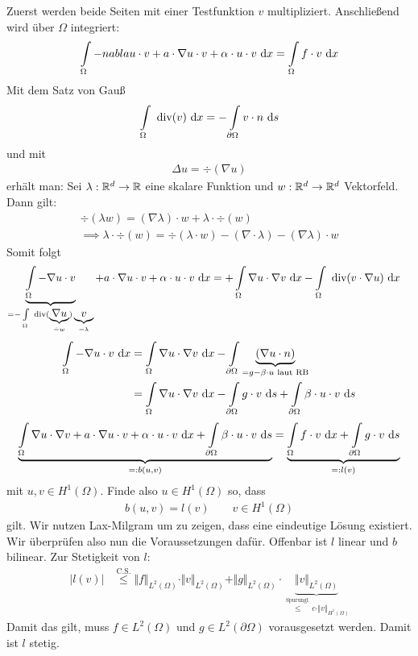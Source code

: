 \documentclass[12pt,a4paper]{article}
\begin{document}
\begin{lösung}
Zuerst werden beide Seiten mit einer Testfunktion $v$ multipliziert. Anschließend wird über $\Omega$ integriert:
\begin{align*}
\int\limits_\Omega -nabla u\cdot v+a\cdot\nabla u\cdot v+\alpha\cdot u\cdot v\text{ d} x=\int\limits_\Omega f\cdot v\text{ d} x
\end{align*}
 Mit dem Satz von Gauß 
 \begin{align*}
 \int\limits_\Omega\text{ div}(v)\text{ d} x=-\int\limits_{\partial\Omega} v\cdot n\text{ d} s
 \end{align*}
 und mit
 \begin{align*}
 \Delta u=\div(\nabla u)
 \end{align*}
 erhält man:
 Sei $\lambda:\mathbb{R}^d\to\mathbb{R}$ eine skalare Funktion und $w:\mathbb{R}^d\to\mathbb{R}^d$ Vektorfeld. Dann gilt:
 \begin{align*}
 \div(\lambda w)=(\nabla\lambda)\cdot w+\lambda\cdot\div(w)\\
 \implies
 \lambda\cdot\div(w)=\div(\lambda\cdot w)-(\nabla\cdot\lambda)-(\nabla\lambda)\cdot w
 \end{align*}
 Somit folgt 
 \begin{align*}
 \underbrace{\int\limits_\Omega -\nabla u\cdot v}_{=-\int\limits_\Omega\text{ div}(\underbrace{\nabla u}_{\hat{=}w})\underbrace{v}_{=\lambda}}+a\cdot\nabla u\cdot v+\alpha\cdot u\cdot v\text{ d} x
 &=+\int\limits_\Omega\nabla u\cdot\nabla v\text{ d} x-\int\limits_\Omega\text{ div}(v\cdot\nabla u)\text{ d} x
 \end{align*}
 \begin{align*}
 \int\limits_\Omega -\nabla u\cdot v\text{ d} x
 &=\int\limits_\Omega\nabla u\cdot\nabla v\text{ d} x-\int\limits_{\partial\Omega}\underbrace{(\nabla u\cdot n)}_{=g-\beta\cdot u\text{ laut RB}}\\
 &=\int\limits_\Omega\nabla u\cdot\nabla v\text{ d} x-\int\limits_{\partial\Omega} g\cdot v\text{ d} s+\int\limits_{\partial\Omega}\beta\cdot u\cdot v\text{ d} s
 \end{align*}
 \begin{align*}
\underbrace{\int\limits_\Omega\nabla u\cdot\nabla v+a\cdot\nabla u\cdot v+\alpha\cdot u\cdot v\text{ d} x+\int\limits_{\partial\Omega}\beta\cdot u\cdot v\text{ d} s}_{=:b(u,v)}
=\underbrace{\int\limits_\Omega f\cdot v\text{ d} x+\int\limits_{\partial\Omega} g\cdot v\text{ d} s}_{=:l(v)}
 \end{align*}
mit $u,v\in H^1(\Omega)$. Finde also $u\in H^1(\Omega)$ so, dass
\begin{align*}
b(u,v)=l(v)\qquad v\in H^1(\Omega)
\end{align*} 
gilt. Wir nutzen Lax-Milgram um zu zeigen, dass eine eindeutige Lösung existiert. Wir überprüfen also nun die Voraussetzungen dafür. Offenbar ist $l$ linear und $b$ bilinear. Zur Stetigkeit von $l$:
\begin{align*}
\big|l(v)\big|&\stackrel{\text{C.S.}}{\leq}\Vert f\Vert_{L^2(\Omega)}\cdot\Vert v\Vert_{L^2(\Omega)}+\Vert g\Vert_{L^2(\Omega)}\cdot\underbrace{\Vert v\Vert_{L^2(\Omega)}}_{\stackrel{\text{Spurungl.}}{\leq} c\cdot\Vert v\Vert_{H^1(\Omega)}}
\end{align*}
Damit das gilt, muss $f\in L^2(\Omega)$ und $g\in L^2(\partial\Omega)$ vorausgesetzt werden. Damit ist $l$ stetig.\\


\end{lösung}
\end{document}
